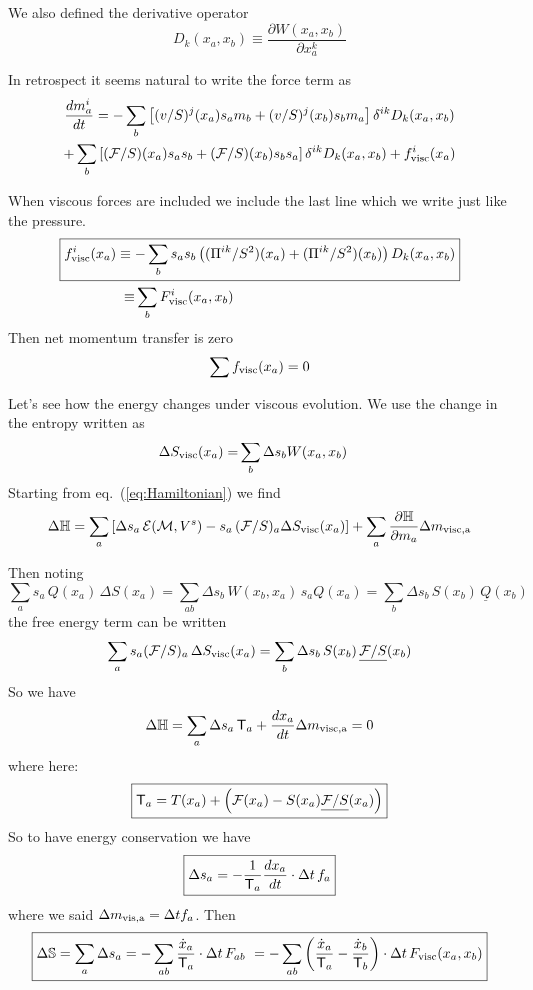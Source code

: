 \documentclass[12pt,aps,preprint,nofootinbib,noshowkeys,noshowpacs,longbibliography,superscriptaddress,tightenlines]{revtex4-2}
\def\Sbb{{\mathbb S}}
\def\Teff{{\sf T}}
\def\F{{\mathcal F}}
\def\Eq#1{eq.~(\ref{#1})}
\def\st{\begin{equation}}
\def\stp{\end{equation}}
\def\E{{\mathcal E}}
\def\M{{\mathcal M}}
\begin{document}
We also defined the derivative operator
\st
 D_{k}(x_a,x_b) \equiv \frac{\partial W(x_a , x_b) }{\partial x_a^k }
\stp

In retrospect it seems natural to write the force term as 
\begin{multline}
\frac{dm_{a}^i}{dt}  =  -\sum_{b} \left[ (v/S)^j(x_a) s_a m_b  + (v/S)^j(x_b) s_b m_a  \right]  \delta^{ik } D_k (x_a, x_b)
    \\
    + \sum_{b} \left[ (\F/S)(x_a)s_a s_b + (\F/S)(x_b) s_b s_a \right] \delta^{ik }  D_k (x_a, x_b)
    + f_{\rm visc}^i(x_a)
\end{multline}

When viscous forces are included we include the last line which 
we write just like the pressure.
\begin{align}
    \Aboxed{
    f_{\rm visc}^i(x_a) \equiv& -\sum_{b} s_a s_b \left( (\Pi^{ik}/S^2)(x_a) + (\Pi^{ik}/S^2)(x_b) \right)  D_k (x_a, x_b)
} \\
    \equiv& \sum_{b} F_{\rm visc}^i(x_a, x_b)
\end{align}
Then net momentum transfer is zero 
\st
\sum f_{\rm visc}(x_a)= 0 
\stp

Let's see how the energy changes under viscous evolution. 
We use the change in the entropy written as
\begin{align}
    \Delta S_{\rm visc} (x_a) =& \sum_{b} \Delta s_b   W(x_a, x_b )  %
\end{align}
Starting from \Eq{eq:Hamiltonian}  we find
\st
\Delta {\mathbb H} = \sum_{a}\left[ \Delta s_a \, \E(\M, V^s)   - s_a \, (\F/S)_a  \Delta S_{\rm visc}(x_a)  \right]   + \sum_{a} \frac{\partial {\mathbb H}}{\partial m_a}  \Delta m_{\rm visc, a}
\stp

Then noting
\st
\sum_{a} s_a \, Q(x_a) \, \Delta S(x_a) =  \sum_{ab}  \Delta s_b  \,  W(x_b, x_a)  \, s_a Q(x_a) = \sum_b \Delta s_b \, S(x_b) \,  \underline{Q}(x_b)
\stp
the free energy term can be written
\st
\sum_a  s_a (\F/S)_a \, \Delta S_{\rm visc}(x_a)   = \sum_b \Delta s_b \, S(x_b)  \, \underline{{\mathcal F}/S}(x_b)
\stp
So we have 
\st
\Delta {\mathbb H} = \sum_a \Delta s_a  \, \Teff_a +  \frac{dx_a}{dt}  \Delta m_{\rm visc, a} = 0
\stp
where here: 
\st
\boxed{
\Teff_a = T(x_a)  + \left({\F}(x_a) - S(x_a) \underline{\F/S}(x_a) \right)
}
\stp
So to have energy conservation we have 
\st
\boxed{
    \Delta s_a =  -\frac{1}{\Teff_a} \frac{dx_a}{dt} \cdot \Delta t \, f_a 
}
\stp
where we said $\Delta m_{\rm vis, a} = \Delta t f_a$.  Then 
\st
\boxed{
\Delta \Sbb = \sum_a \Delta s_a = - \sum_{ab} \frac{\dot x_a}{\Teff_a}  \cdot \Delta t\, F_{ab}\ =  - \sum_{ab} \left( 
    \frac{\dot x_a}{\Teff_a}   
    -
\frac{\dot x_b}{\Teff_b}   \right) \cdot \Delta t \, F_{\rm visc}(x_a, x_b) 
}
\stp
\end{document}
